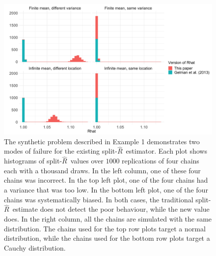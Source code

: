 \documentclass[american,]{article}
\newcommand{\sRhat}{split-$\widehat{R}$}
\begin{document}
\begin{figure}
\centering
\includegraphics[width=\textwidth]{graphics/simple_rhat_compare.png}
\caption{  The synthetic problem described in Example 1 demonstrates
two modes of failure for the existing \sRhat\ estimator. Each plot shows
histograms of \sRhat\ values over $1000$ replications of four chains each
with a thousand draws. In the left column, one of these four chains was 
incorrect. In the top left plot, one of the four chains had a variance that was too low.
In the bottom left plot, one of the four chains was systematically biased. 
In both cases, the traditional \sRhat\ estimate does not detect the poor
behaviour, while the new value does. In the right column, all the chains are
simulated with the same distribution. The chains used for the top row plots target 
a normal distribution, while the chains used for the bottom row plots target
a Cauchy distribution. \label{fig:simple_example}}
\end{figure}
\end{document}
